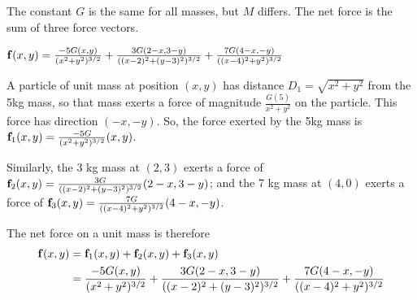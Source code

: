 \begin{hint} 
The constant $G$ is the same for all masses, but $M$ differs. The net force is the sum of three force vectors.
\end{hint}

\begin{answer} 
$\mathbf{f}(x,y)=\frac{-5G(x,y)}{(x^2+y^2)^{3/2}}+\frac{3G(2-x,3-y)}{((x-2)^2+(y-3)^2)^{3/2}}+\frac{7G(4-x,-y)}{((x-4)^2+y^2)^{3/2}}
$
\end{answer}

\begin{solution}
A particle of unit mass at position $(x,y)$ has distance $D_1=\sqrt{x^2+y^2}$ from the 5kg mass, so that mass exerts a force of magnitude $\frac{G(5)}{x^2+y^2}$ on the particle. This force has direction $(-x,-y)$. So, the force exerted by the 5kg mass is $\mathbf{f}_1(x,y)=\frac{-5G}{(x^2+y^2)^{3/2}}(x,y)$.

Similarly, the 3 kg mass at $(2,3)$ exerts a force of $\mathbf{f}_2(x,y)=\frac{3G}{((x-2)^2+(y-3)^2)^{3/2}}(2-x,3-y)$; and the 7 kg mass at $(4,0)$ exerts a force of $\mathbf{f}_3(x,y)=\frac{7G}{((x-4)^2+y^2)^{3/2}}(4-x,-y)$.

The net force on a unit mass is therefore
\begin{align*}
\mathbf{f}(x,y)&=\mathbf{f}_1(x,y)+\mathbf{f}_2(x,y)+\mathbf{f}_3(x,y)\\
&=\frac{-5G(x,y)}{(x^2+y^2)^{3/2}}+\frac{3G(2-x,3-y)}{((x-2)^2+(y-3)^2)^{3/2}}+\frac{7G(4-x,-y)}{((x-4)^2+y^2)^{3/2}}
\end{align*}
\end{solution}

